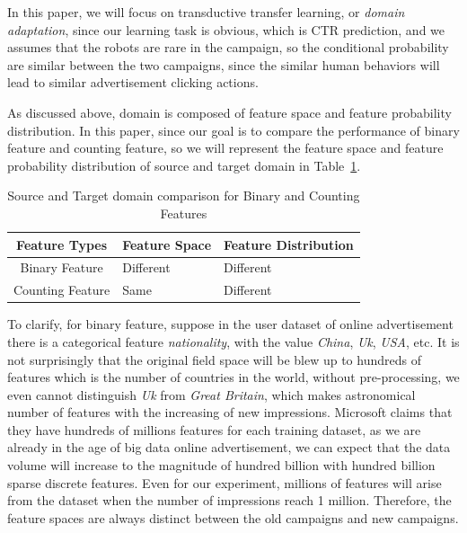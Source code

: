 \documentclass{sig-alternate}
\begin{document}
In this paper, we will focus on transductive transfer learning, or \textit{domain adaptation}, since our learning task is obvious, which is CTR prediction, and we assumes that the robots are rare in the campaign, so the conditional probability are similar between the two campaigns, since the similar human behaviors will lead to similar advertisement clicking actions. 

As discussed above, domain is composed of feature space and feature probability distribution. In this paper, since our goal is to compare the performance of binary feature and counting feature, so we will represent the feature space and feature probability distribution of source and target domain in Table~\ref{tab:domainadapt}.

\begin{table}[t]
\begin{tabular}{ c | l | l }
Feature Types & Feature Space & Feature Distribution \\
\hline \hline
Binary Feature & Different & Different  \\
Counting Feature & Same & Different
\end{tabular}
\caption{Source and Target domain comparison for Binary and Counting Features}
\label{tab:domainadapt}
\end{table}

To clarify, for binary feature, suppose in the user dataset of online advertisement there is a categorical feature \textit{nationality}, with the value \textit{China}, \textit{Uk}, \textit{USA}, etc. It is not surprisingly that the original field space will be blew up to hundreds of features which is the number of countries in the world, without pre-processing, we even cannot distinguish \textit{Uk} from \textit{Great Britain}, which makes astronomical number of features with the increasing of new impressions. Microsoft claims that they have hundreds of millions features \cite{graepel2010web} for each training dataset, as we are already in the age of big data online advertisement, we can expect that the data volume will increase to the magnitude of hundred billion with hundred billion sparse discrete features. Even for our experiment, millions of features will arise from the dataset when the number of impressions reach 1 million. Therefore, the feature spaces are always distinct between the old campaigns and new campaigns. 
\end{document}
